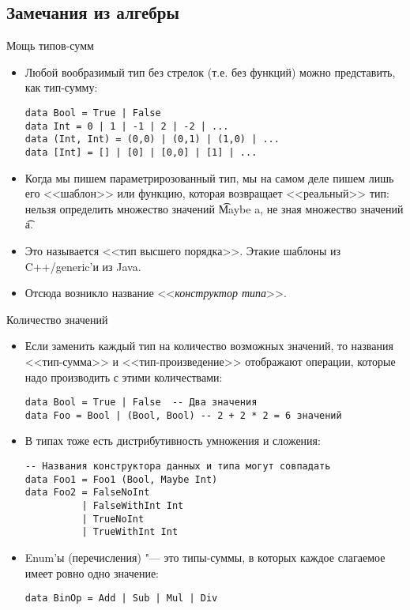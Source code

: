 \subsection{Замечания из алгебры}
\begin{frame}
\end{frame}

\begin{frame}[fragile]{Мощь типов-сумм}
	\begin{itemize}
		\item Любой вообразимый тип без стрелок (т.е. без функций) можно представить, как тип-сумму:
\begin{verbatim}
data Bool = True | False
data Int = 0 | 1 | -1 | 2 | -2 | ...
data (Int, Int) = (0,0) | (0,1) | (1,0) | ...
data [Int] = [] | [0] | [0,0] | [1] | ...
\end{verbatim}
		\item Когда мы пишем параметрирозованный тип, мы на самом деле пишем лишь его <<шаблон>> или функцию, которая возвращает <<реальный>> тип:
			нельзя определить множество значений \t{Maybe a}, не зная множество значений \t{a}.
		\item
			Это называется <<тип высшего порядка>>.
			Этакие шаблоны из C++/generic'и из Java.
		\item
			Отсюда возникло название <<\textit{конструктор типа}>>.
	\end{itemize}
\end{frame}

\begin{frame}[fragile]{Количество значений}
	\begin{itemize}
		\item
			Если заменить каждый тип на количество возможных значений, то названия <<тип-сумма>> и <<тип-произведение>> отображают
			операции, которые надо производить с этими количествами:
\begin{verbatim}
data Bool = True | False  -- Два значения
data Foo = Bool | (Bool, Bool) -- 2 + 2 * 2 = 6 значений
\end{verbatim}
		\item
			В типах тоже есть дистрибутивность умножения и сложения:
\begin{verbatim}
-- Названия конструктора данных и типа могут совпадать
data Foo1 = Foo1 (Bool, Maybe Int)
data Foo2 = FalseNoInt
          | FalseWithInt Int
          | TrueNoInt
          | TrueWithInt Int
\end{verbatim}
		\item Enum'ы (перечисления) "--- это типы-суммы, в которых каждое слагаемое имеет ровно одно значение:
\begin{verbatim}
data BinOp = Add | Sub | Mul | Div
\end{verbatim}
	\end{itemize}
\end{frame}

